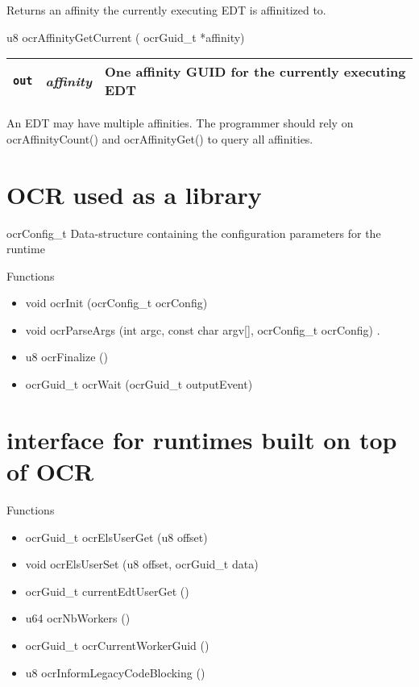 Returns an affinity the currently executing E\-D\-T is affinitized to. 

\begin{boxedcode}
 u8 ocrAffinityGetCurrent ( ocrGuid\_t *affinity)
\end{boxedcode}


\begin{table}[h]
\begin{tabular}{l l l}
\hline
\mbox{\tt out}  & {\em affinity} & One affinity G\-U\-I\-D for the currently executing E\-D\-T \\
\hline
\end{tabular}
\end{table}

\descr
An E\-D\-T may have multiple affinities. The programmer should rely on 
ocr\-Affinity\-Count() and ocr\-Affinity\-Get() to query all affinities.

\section{OCR used as a library}


ocrConfig\_t
Data-structure containing the configuration parameters for the runtime

Functions
\begin{itemize}
\item void ocrInit (ocrConfig\_t ocrConfig)
 
\item void ocrParseArgs (int argc, const char argv[], ocrConfig\_t ocrConfig)
 .
\item u8 ocrFinalize ()

\item ocrGuid\_t ocrWait (ocrGuid\_t outputEvent)
\end{itemize}



\section{interface for runtimes built on top of OCR}

Functions
\begin{itemize}
\item  ocrGuid\_t ocrElsUserGet (u8 offset)
 
\item void ocrElsUserSet (u8 offset, ocrGuid\_t data)
 
\item ocrGuid\_t currentEdtUserGet ()
 
\item  u64 ocrNbWorkers ()

\item  ocrGuid\_t ocrCurrentWorkerGuid ()
 
\item  u8 ocrInformLegacyCodeBlocking ()
 
\end{itemize}


